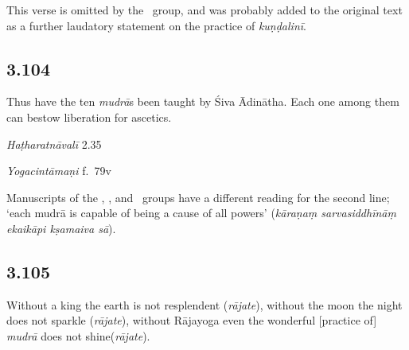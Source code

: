 \begin{ekdosis}
\begin{philcomm}[hp03_103_1]
This verse is omitted by the \textalpha\ group, and was probably added to the original text as a further laudatory statement on the practice of \emph{kuṇḍalinī}.
\end{philcomm}


\subsection*{3.104}
\begin{translation}[hp03_104]
Thus have the ten \emph{mudrā}s been taught by Śiva Ādinātha. Each one among them can bestow liberation for ascetics.
\end{translation}

\begin{sources}[hp03_104]
\end{sources}

\begin{testimonia}[hp03_104]

\emph{Haṭharatnāvalī} 2.35
\begin{versinnote}
\end{versinnote}

\emph{Yogacintāmaṇi} f.~79v
\begin{versinnote}
\end{versinnote}

\end{testimonia}

\begin{philcomm}[hp03_104]
Manuscripts of the \textbeta, \texteta, and \textepsilon\ groups have a different reading for the second line; `each mudrā is capable of being a cause of all powers' (\emph{kāraṇaṃ sarvasiddhīnāṃ ekaikāpi kṣamaiva sā}).
\end{philcomm}


\subsection*{3.105}
\begin{translation}[hp03_105]
Without a king the earth is not resplendent (\emph{rājate}), without the moon the night does not sparkle (\emph{rājate}), without Rājayoga even the wonderful [practice of] \emph{mudrā} does not shine(\emph{rājate}).
\end{translation}


\end{ekdosis}
